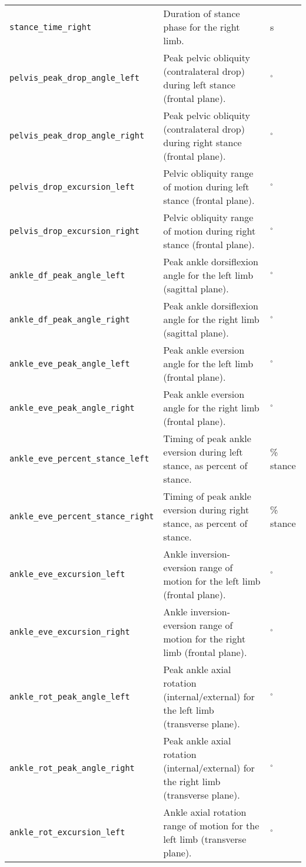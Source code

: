 \begin{longtable}{@{}l p{} l@{}}
    \texttt{stance\_time\_right} & Duration of stance phase for the right limb. & s \\
    \texttt{pelvis\_peak\_drop\_angle\_left} & Peak pelvic obliquity (contralateral drop) during left stance (frontal plane). & $^\circ$ \\
    \texttt{pelvis\_peak\_drop\_angle\_right} & Peak pelvic obliquity (contralateral drop) during right stance (frontal plane). & $^\circ$ \\
    \texttt{pelvis\_drop\_excursion\_left} & Pelvic obliquity range of motion during left stance (frontal plane). & $^\circ$ \\
    \texttt{pelvis\_drop\_excursion\_right} & Pelvic obliquity range of motion during right stance (frontal plane). & $^\circ$ \\
    \texttt{ankle\_df\_peak\_angle\_left} & Peak ankle dorsiflexion angle for the left limb (sagittal plane). & $^\circ$ \\
    \texttt{ankle\_df\_peak\_angle\_right} & Peak ankle dorsiflexion angle for the right limb (sagittal plane). & $^\circ$ \\
    \texttt{ankle\_eve\_peak\_angle\_left} & Peak ankle eversion angle for the left limb (frontal plane). & $^\circ$ \\
    \texttt{ankle\_eve\_peak\_angle\_right} & Peak ankle eversion angle for the right limb (frontal plane). & $^\circ$ \\
    \texttt{ankle\_eve\_percent\_stance\_left} & Timing of peak ankle eversion during left stance, as percent of stance. & \% stance \\
    \texttt{ankle\_eve\_percent\_stance\_right} & Timing of peak ankle eversion during right stance, as percent of stance. & \% stance \\
    \texttt{ankle\_eve\_excursion\_left} & Ankle inversion-eversion range of motion for the left limb (frontal plane). & $^\circ$ \\
    \texttt{ankle\_eve\_excursion\_right} & Ankle inversion-eversion range of motion for the right limb (frontal plane). & $^\circ$ \\
    \texttt{ankle\_rot\_peak\_angle\_left} & Peak ankle axial rotation (internal/external) for the left limb (transverse plane). & $^\circ$ \\
    \texttt{ankle\_rot\_peak\_angle\_right} & Peak ankle axial rotation (internal/external) for the right limb (transverse plane). & $^\circ$ \\
    \texttt{ankle\_rot\_excursion\_left} & Ankle axial rotation range of motion for the left limb (transverse plane). & $^\circ$ \\

\end{longtable}
